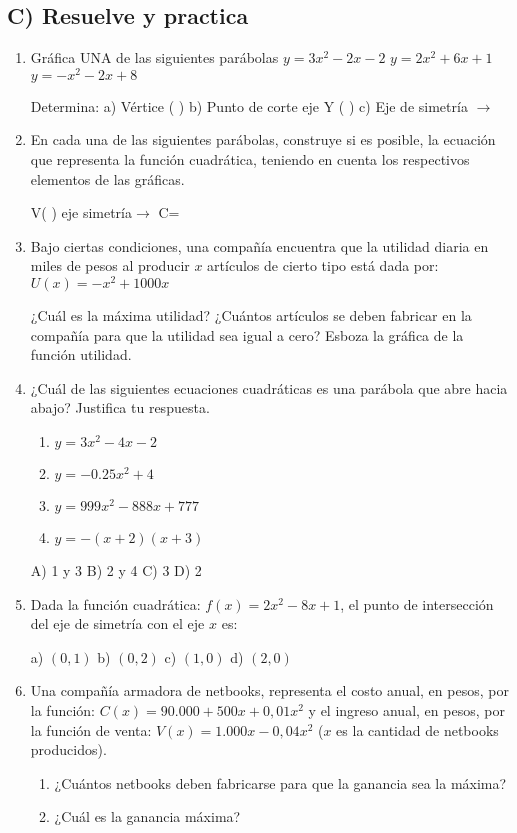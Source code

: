 \documentclass[12pt,a4paper]{article}
\begin{document}
\subsection*{C) Resuelve y practica}

\begin{enumerate}
\item Gráfica UNA de las siguientes parábolas $y = 3x^2 - 2x - 2$ \quad $y = 2x^2 + 6x + 1$ \quad $y = -x^2 - 2x + 8$

Determina: a) Vértice ( \quad ) \quad b) Punto de corte eje Y ( \quad ) \quad c) Eje de simetría $\rightarrow$

\item En cada una de las siguientes parábolas, construye si es posible, la ecuación que representa la función cuadrática, teniendo en cuenta los respectivos elementos de las gráficas.

V( \quad ) eje simetría$\rightarrow$ \quad C=

\item Bajo ciertas condiciones, una compañía encuentra que la utilidad diaria en miles de pesos al producir $x$ artículos de cierto tipo está dada por: $U(x) = -x^2 + 1000x$

¿Cuál es la máxima utilidad? ¿Cuántos artículos se deben fabricar en la compañía para que la utilidad sea igual a cero? Esboza la gráfica de la función utilidad.

\item ¿Cuál de las siguientes ecuaciones cuadráticas es una parábola que abre hacia abajo? Justifica tu respuesta.

\begin{enumerate}
\item $y = 3x^2 - 4x - 2$
\item $y = -0.25x^2 + 4$
\item $y = 999x^2 - 888x + 777$
\item $y = -(x + 2)(x + 3)$
\end{enumerate}

A) 1 y 3 \quad B) 2 y 4 \quad C) 3 \quad D) 2

\item Dada la función cuadrática: $f(x) = 2x^2 - 8x + 1$, el punto de intersección del eje de simetría con el eje $x$ es:

a) $(0,1)$ \quad b) $(0,2)$ \quad c) $(1,0)$ \quad d) $(2,0)$

\item Una compañía armadora de netbooks, representa el costo anual, en pesos, por la función: $C(x) = 90.000 + 500x + 0,01x^2$ y el ingreso anual, en pesos, por la función de venta: $V(x) = 1.000x - 0,04x^2$ ($x$ es la cantidad de netbooks producidos).

\begin{enumerate}[label=\Alph*.]
\item ¿Cuántos netbooks deben fabricarse para que la ganancia sea la máxima?
\item ¿Cuál es la ganancia máxima?
\end{enumerate}

\end{enumerate}
\end{document}
